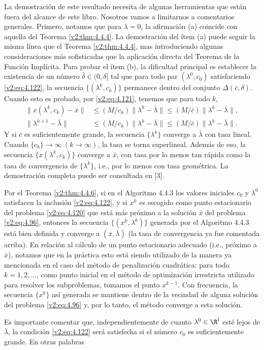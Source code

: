 La demostración de este resultado necesita de algunas herramientas que están fuera del alcance de este libro. Nosotros vamos a limitarnos a comentarios generales. Primero, notamos que para $\lambda = 0$, la afirmación (a) coincide con aquella del Teorema \ref{v2:thm:4.4.4}. La demostración del ítem (a) puede seguir la misma línea que el Teorema \ref{v2:thm:4.4.4}, mas introduciendo algunas consideraciones más sofisticadas que la aplicación directa del Teorema de la Función Implícita. Para probar el ítem (b), la dificultad principal es establecer la existencia de un número $\bar{\delta} \in (0, \delta]$ tal que para todo par $(\lambda^0, c_0)$ satisfaciendo \eqref{v2:eq:4.122}, la secuencia $\{(\lambda^k, c_k)\}$ permanece dentro del conjunto $\Delta(\bar{c}, \delta)$. Cuando esto es probado, por \eqref{v2:eq:4.121}, tenemos que para todo $k$,
\begin{align*}
    \|x(\lambda^k, c_k) - \bar{x}\| &\le (M/c_k) \|\lambda^k - \bar{\lambda}\| \le (M/\bar{c}) \|\lambda^k - \bar{\lambda}\|, \\
    \|\lambda^{k+1} - \bar{\lambda}\| &\le (M/c_k) \|\lambda^k - \bar{\lambda}\| \le (M/\bar{c}) \|\lambda^k - \bar{\lambda}\|.
\end{align*}
Y si $\bar{c}$ es suficientemente grande, la secuencia $\{\lambda^k\}$ converge a $\bar{\lambda}$ con tasa lineal. Cuando $\{c_k\} \to \infty \ (k \to \infty)$, la tasa se torna superlineal. Además de eso, la secuencia $\{x(\lambda^k, c_k)\}$ converge a $\bar{x}$, con tasa por lo menos tan rápida como la tasa de convergencia de $\{\lambda^k\}$, i.e., por lo menos con tasa geométrica. La demostración completa puede ser consultada en [3].

Por el Teorema \ref{v2:thm:4.4.6}, si en el Algoritmo 4.4.3 los valores iniciales $c_0$ y $\lambda^0$ satisfacen la inclusión \eqref{v2:eq:4.122}, y si $x^k$ es escogido como punto estacionario del problema \eqref{v2:eq:4.120} que está más próximo a la solución $\bar{x}$ del problema \eqref{v2:eq:4.96}, entonces la secuencia $\{(x^k, \lambda^k)\}$ generada por el Algoritmo 4.4.3 está bien definida y converge a $(\bar{x}, \bar{\lambda})$ (la tasa de convergencia ya fue comentada arriba). En relación al cálculo de un punto estacionario adecuado (i.e., próximo a $\bar{x}$), notamos que en la práctica esto está siendo utilizado de la manera ya mencionada en el caso del método de penalización cuadrática: para todo $k = 1, 2, \dots$, como punto inicial en el método de optimización irrestricta utilizado para resolver los subproblemas, tomamos el punto $x^{k-1}$. Con frecuencia, la secuencia $\{x^k\}$ así generada se mantiene dentro de la vecindad de alguna solución del problema \eqref{v2:eq:4.96} y, por lo tanto, el método converge a esta solución.

Es importante comentar que, independientemente de cuanto $\lambda^0 \in \R^l$ esté lejos de $\bar{\lambda}$, la condición \eqref{v2:eq:4.122} será satisfecha si el número $c_0$ es suficientemente grande. En otras palabras